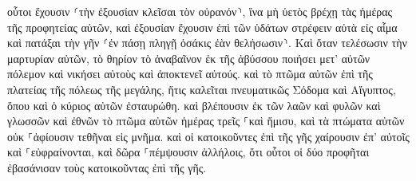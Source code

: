 \documentclass{openreader}
\begin{document}
οὗτοι ἔχουσιν ⸂τὴν ἐξουσίαν κλεῖσαι τὸν οὐρανόν⸃, ἵνα μὴ ὑετὸς βρέχῃ τὰς ἡμέρας τῆς προφητείας αὐτῶν, καὶ ἐξουσίαν ἔχουσιν ἐπὶ τῶν ὑδάτων στρέφειν αὐτὰ εἰς αἷμα καὶ πατάξαι τὴν γῆν ⸂ἐν πάσῃ πληγῇ ὁσάκις ἐὰν θελήσωσιν⸃. 
Καὶ ὅταν τελέσωσιν τὴν μαρτυρίαν αὐτῶν, τὸ θηρίον τὸ ἀναβαῖνον ἐκ τῆς ἀβύσσου ποιήσει μετ’ αὐτῶν πόλεμον καὶ νικήσει αὐτοὺς καὶ ἀποκτενεῖ αὐτούς. 
καὶ τὸ πτῶμα αὐτῶν ἐπὶ τῆς πλατείας τῆς πόλεως τῆς μεγάλης, ἥτις καλεῖται πνευματικῶς Σόδομα καὶ Αἴγυπτος, ὅπου καὶ ὁ κύριος αὐτῶν ἐσταυρώθη. 
καὶ βλέπουσιν ἐκ τῶν λαῶν καὶ φυλῶν καὶ γλωσσῶν καὶ ἐθνῶν τὸ πτῶμα αὐτῶν ἡμέρας τρεῖς ⸀καὶ ἥμισυ, καὶ τὰ πτώματα αὐτῶν οὐκ ⸀ἀφίουσιν τεθῆναι εἰς μνῆμα. 
καὶ οἱ κατοικοῦντες ἐπὶ τῆς γῆς χαίρουσιν ἐπ’ αὐτοῖς καὶ ⸀εὐφραίνονται, καὶ δῶρα ⸀πέμψουσιν ἀλλήλοις, ὅτι οὗτοι οἱ δύο προφῆται ἐβασάνισαν τοὺς κατοικοῦντας ἐπὶ τῆς γῆς. 
\end{document}

